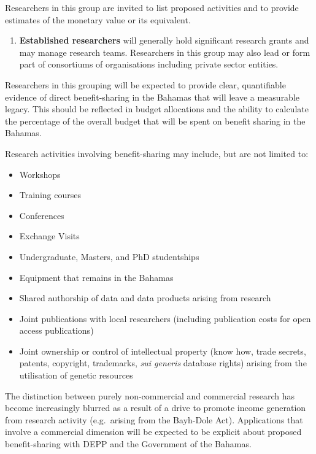 \documentclass[
]{book}
\providecommand{\tightlist}{%
  \setlength{\itemsep}{0pt}\setlength{\parskip}{0pt}}
\begin{document}
Researchers in this group are invited to list proposed activities and to provide estimates of the monetary value or its equivalent.

\begin{enumerate}
\def\labelenumi{\arabic{enumi}.}
\setcounter{enumi}{1}
\tightlist
\item
  \textbf{Established researchers} will generally hold significant research grants and may manage research teams. Researchers in this group may also lead or form part of consortiums of organisations including private sector entities.
\end{enumerate}

Researchers in this grouping will be expected to provide clear, quantifiable evidence of direct benefit-sharing in the Bahamas that will leave a measurable legacy. This should be reflected in budget allocations and the ability to calculate the percentage of the overall budget that will be spent on benefit sharing in the Bahamas.

Research activities involving benefit-sharing may include, but are not limited to:

\begin{itemize}
\tightlist
\item
  Workshops
\item
  Training courses
\item
  Conferences
\item
  Exchange Visits
\item
  Undergraduate, Masters, and PhD studentships
\item
  Equipment that remains in the Bahamas
\item
  Shared authorship of data and data products arising from research
\item
  Joint publications with local researchers (including publication costs for open access publications)
\item
  Joint ownership or control of intellectual property (know how, trade secrets, patents, copyright, trademarks, \emph{sui generis} database rights) arising from the utilisation of genetic resources
\end{itemize}

The distinction between purely non-commercial and commercial research has become increasingly blurred as a result of a drive to promote income generation from research activity (e.g.~arising from the Bayh-Dole Act). Applications that involve a commercial dimension will be expected to be explicit about proposed benefit-sharing with DEPP and the Government of the Bahamas.
\end{document}
